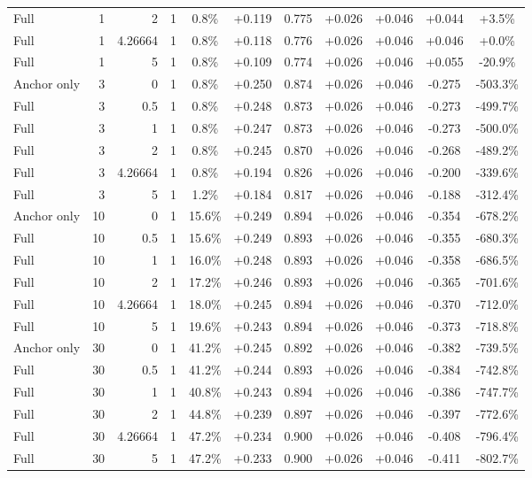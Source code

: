 \begin{table}[htbp]
\begin{tabular}{lrrrccccccc}
Full & 1 & 2 & 1 & 0.8\% & +0.119 & 0.775 & +0.026 & +0.046 & +0.044 & +3.5\% \\
Full & 1 & 4.26664 & 1 & 0.8\% & +0.118 & 0.776 & +0.026 & +0.046 & +0.046 & +0.0\% \\
Full & 1 & 5 & 1 & 0.8\% & +0.109 & 0.774 & +0.026 & +0.046 & +0.055 & -20.9\% \\
Anchor only & 3 & 0 & 1 & 0.8\% & +0.250 & 0.874 & +0.026 & +0.046 & -0.275 & -503.3\% \\
Full & 3 & 0.5 & 1 & 0.8\% & +0.248 & 0.873 & +0.026 & +0.046 & -0.273 & -499.7\% \\
Full & 3 & 1 & 1 & 0.8\% & +0.247 & 0.873 & +0.026 & +0.046 & -0.273 & -500.0\% \\
Full & 3 & 2 & 1 & 0.8\% & +0.245 & 0.870 & +0.026 & +0.046 & -0.268 & -489.2\% \\
Full & 3 & 4.26664 & 1 & 0.8\% & +0.194 & 0.826 & +0.026 & +0.046 & -0.200 & -339.6\% \\
Full & 3 & 5 & 1 & 1.2\% & +0.184 & 0.817 & +0.026 & +0.046 & -0.188 & -312.4\% \\
Anchor only & 10 & 0 & 1 & 15.6\% & +0.249 & 0.894 & +0.026 & +0.046 & -0.354 & -678.2\% \\
Full & 10 & 0.5 & 1 & 15.6\% & +0.249 & 0.893 & +0.026 & +0.046 & -0.355 & -680.3\% \\
Full & 10 & 1 & 1 & 16.0\% & +0.248 & 0.893 & +0.026 & +0.046 & -0.358 & -686.5\% \\
Full & 10 & 2 & 1 & 17.2\% & +0.246 & 0.893 & +0.026 & +0.046 & -0.365 & -701.6\% \\
Full & 10 & 4.26664 & 1 & 18.0\% & +0.245 & 0.894 & +0.026 & +0.046 & -0.370 & -712.0\% \\
Full & 10 & 5 & 1 & 19.6\% & +0.243 & 0.894 & +0.026 & +0.046 & -0.373 & -718.8\% \\
Anchor only & 30 & 0 & 1 & 41.2\% & +0.245 & 0.892 & +0.026 & +0.046 & -0.382 & -739.5\% \\
Full & 30 & 0.5 & 1 & 41.2\% & +0.244 & 0.893 & +0.026 & +0.046 & -0.384 & -742.8\% \\
Full & 30 & 1 & 1 & 40.8\% & +0.243 & 0.894 & +0.026 & +0.046 & -0.386 & -747.7\% \\
Full & 30 & 2 & 1 & 44.8\% & +0.239 & 0.897 & +0.026 & +0.046 & -0.397 & -772.6\% \\
Full & 30 & 4.26664 & 1 & 47.2\% & +0.234 & 0.900 & +0.026 & +0.046 & -0.408 & -796.4\% \\
Full & 30 & 5 & 1 & 47.2\% & +0.233 & 0.900 & +0.026 & +0.046 & -0.411 & -802.7\% \\

\end{tabular}
\end{table}

